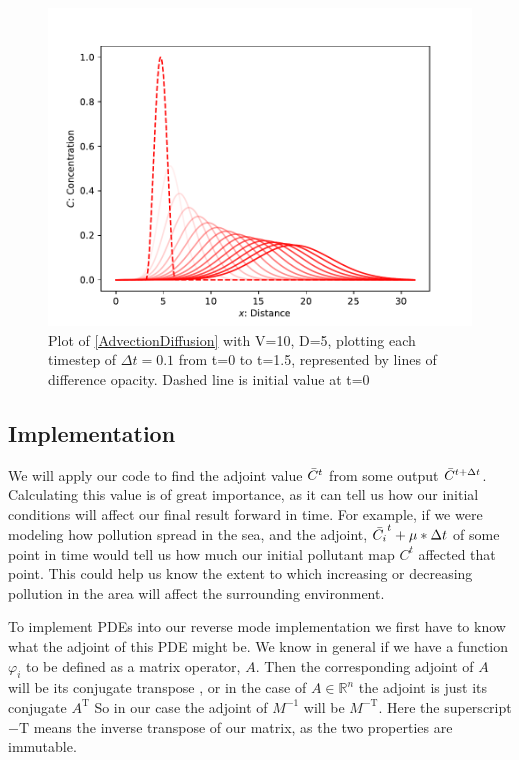 \documentclass{article}
\begin{document}
\begin{figure}[h]
    \centering
    \includegraphics{images/Graph_PDE.pdf}
    \caption{Plot of \eqref{AdvectionDiffusion} with V=10, D=5, plotting each timestep of $\Delta t=0.1$ from t=0 to t=1.5, represented by lines of difference opacity. Dashed line is initial value at t=0}
    \label{fig:ODE}
\end{figure}

\subsection{Implementation}
We will apply our code to find the adjoint value $\Bar{C}^t$ from some output $\Bar{C}^{t+\Delta t}$. Calculating this value is of great importance, as it can tell us how our initial conditions will affect our final result forward in time. For example, if we were modeling how pollution spread in the sea, and the adjoint, $\Bar{C_i}^t+\mu*\Delta t$ of some point in time would tell us how much our initial pollutant map $C^t$ affected that point. This could help us know the extent to which increasing or decreasing pollution in the area will affect the surrounding environment.

To implement PDEs into our reverse mode implementation we first have to know what the adjoint of this PDE might be. We know in general if we have a function $\varphi_i$ to be defined as a matrix operator, $A$. Then the corresponding adjoint of $A$ will be its conjugate transpose \cite{adjointref}, or in the case of $A \in \mathbb{R}^n$ the adjoint is just its conjugate $A^\text{T}$ So in our case the adjoint of $M^{-1}$ will be $M^{-\text{T}}$. Here the superscript $-\text{T}$ means the inverse transpose of our matrix, as the two properties are immutable.
\end{document}
